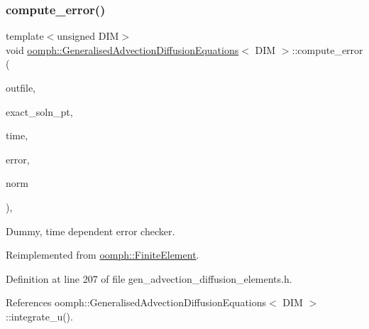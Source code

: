 \subsubsection{\texorpdfstring{compute\+\_\+error()}{compute\_error()}\hspace{0.1cm}{\footnotesize\ttfamily [2/2]}}
{\footnotesize\ttfamily template$<$unsigned D\+IM$>$ \\
void \hyperlink{classoomph_1_1GeneralisedAdvectionDiffusionEquations}{oomph\+::\+Generalised\+Advection\+Diffusion\+Equations}$<$ D\+IM $>$\+::compute\+\_\+error (\begin{DoxyParamCaption}\item[{std\+::ostream \&}]{outfile,  }\item[{\hyperlink{classoomph_1_1FiniteElement_ad4ecf2b61b158a4b4d351a60d23c633e}{Finite\+Element\+::\+Unsteady\+Exact\+Solution\+Fct\+Pt}}]{exact\+\_\+soln\+\_\+pt,  }\item[{const double \&}]{time,  }\item[{double \&}]{error,  }\item[{double \&}]{norm }\end{DoxyParamCaption})\hspace{0.3cm}{\ttfamily [inline]}, {\ttfamily [virtual]}}



Dummy, time dependent error checker. 



Reimplemented from \hyperlink{classoomph_1_1FiniteElement_a7f67853506dc73fa6b7505108de22d1f}{oomph\+::\+Finite\+Element}.



Definition at line 207 of file gen\+\_\+advection\+\_\+diffusion\+\_\+elements.\+h.



References oomph\+::\+Generalised\+Advection\+Diffusion\+Equations$<$ D\+I\+M $>$\+::integrate\+\_\+u().

\mbox{\label{classoomph_1_1GeneralisedAdvectionDiffusionEquations_ad30d41db43db57884cac9a0223715b50}} 
